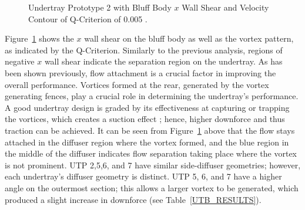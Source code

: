 \begin{figure}[!htb] 
    \centering
    \noindent{}
    \caption{Undertray Prototype 2 with Bluff Body $x$ Wall Shear and Velocity Contour of Q-Criterion of 0.005 .}
      \label{fig:3D_QCRIT_WSHEAR_UTP2}
\end{figure}

\noindent Figure~\ref{fig:3D_QCRIT_WSHEAR_UTP2} shows the $x$ wall shear on the bluff body as well as the vortex pattern, as indicated by the Q-Criterion. Similarly to the previous analysis, regions of negative $x$ wall shear indicate the separation region on the undertray. As has been shown previously, flow attachment is a crucial factor in improving the overall performance. Vortices formed at the rear, generated by the vortex generating fences, play a crucial role in determining the undertray's performance. A good undertray design is graded by its effectiveness at capturing or trapping the vortices, which creates a suction effect \cite{Bouferrouk2014OnVehicles}; hence, higher downforce and thus traction can be achieved. It can be seen from Figure~\ref{fig:3D_QCRIT_WSHEAR_UTP2} above that the flow stays attached in the diffuser region where the vortex formed, and the blue region in the middle of the diffuser indicates flow separation taking place where the vortex is not prominent. UTP 2,5,6, and 7 have similar side-diffuser geometries; however, each undertray's diffuser geometry is distinct. UTP 5, 6, and 7 have a higher angle on the outermost section; this allows a larger vortex to be generated, which produced a slight increase in downforce (see Table~\ref{UTB_RESULTS}).

